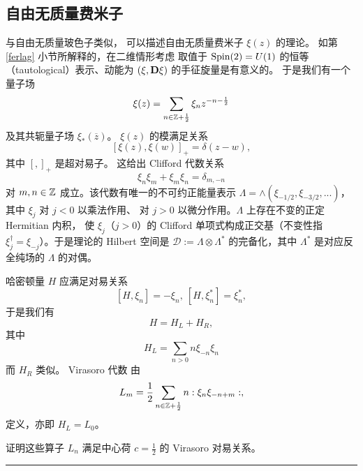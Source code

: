 \subsection{自由无质量费米子} 

与自由无质量玻色子类似，
可以描述自由无质量费米子 $\xi(z)$ 的理论。
如第 \ref{ferlag} 小节所解释的，在二维情形考虑
取值于 ${\rm Spin}(2)=U(1)$ 的恒等（tautological）表示、动能为 $(\xi,\bold D \xi)$ 的手征旋量是有意义的。
于是我们有一个量子场
$$
\xi(z)=\sum_{n\in \Bbb Z+\frac{1}{2}}\xi_n z^{-n-\frac{1}{2}}
$$ 
及其共轭量子场 $\xi_*(\overline z)$。
$\xi(z)$ 的模满足关系
$$
[\xi(z),\xi(w)]_+=\delta(z-w), 
$$
其中 $[,]_+$ 是超对易子。
这给出 Clifford 代数关系
$$
\xi_n\xi_m+\xi_m\xi_n=\delta_{m,-n}
$$
对 $m,n\in \Bbb Z$ 成立。该代数有唯一的不可约正能量表示
$\Lambda=\wedge (\xi_{-1/2},\xi_{-3/2},...)$，其中 $\xi_j$ 对 $j<0$ 以乘法作用、
对 $j>0$ 以微分作用。$\Lambda$ 上存在不变的正定 Hermitian 内积，
使 $\xi_j$（$j>0$）的 Clifford 单项式构成正交基（不变性指
$\xi_j^\dagger=\xi_{-j}$）。于是理论的 Hilbert 空间是 $\mathcal D:=\Lambda\otimes \Lambda^*$ 的完备化，其中 $\Lambda^*$ 是对应反全纯场的 $\Lambda$ 的对偶。

哈密顿量 $H$ 应满足对易关系
$$
[H,\xi_n]=-\xi_n,\ [H,\xi_n^*]=\xi_n^*,
$$ 
于是我们有
$$
H=H_L+H_R,
$$
其中
$$
H_L=\sum_{n>0}n\xi_{-n}\xi_n
$$
而 $H_R$ 类似。
Virasoro 代数
由
$$
L_m=\frac{1}{2}\sum_{n\in \Bbb Z+\frac{1}{2}}n:\xi_n\xi_{-n+m}:,
$$
定义，亦即 $H_L=L_0$。

\begin{exercise} 证明这些算子 $L_n$ 满足中心荷 $c=\frac{1}{2}$ 的 Virasoro 对易关系。
\end{exercise}

\bigskip
\noindent\rule{\textwidth}{0.6pt}

